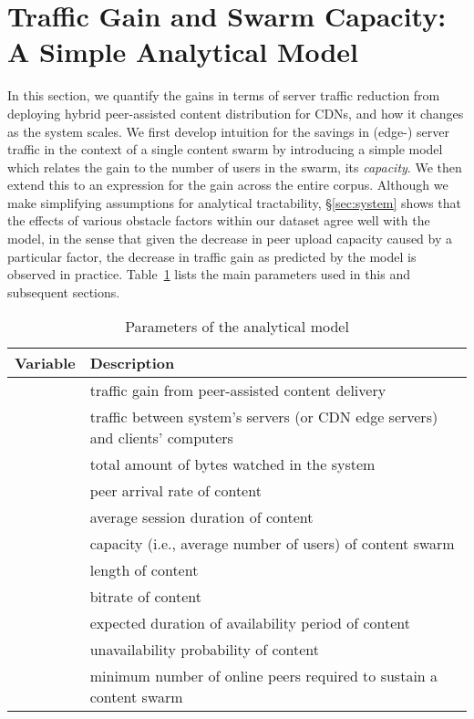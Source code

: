 \documentclass[10pt, conference, letterpaper]{IEEEtran}
\newcommand\tref[1]{Table~\ref{#1}}
\begin{document}
 \section{Traffic Gain and Swarm Capacity: A Simple Analytical Model}
\label{sec:analytical_model}
In this section, we quantify the gains in terms of server traffic reduction from deploying hybrid peer-assisted content distribution for CDNs, and how it changes as the system scales. We first develop intuition for the savings in (edge-) server traffic in the context of a single content swarm by introducing a simple model which relates the gain to the number of users in the swarm, its \emph{capacity}. We then extend this to an expression for the gain across the entire corpus. Although we make simplifying assumptions for analytical tractability, \S\ref{sec:system} shows that the effects of various obstacle factors within our dataset agree well with the model, in the sense that given the decrease in peer upload capacity caused by a particular factor, the decrease in traffic gain as predicted by the model is observed in practice. \tref{tbl:params} lists the main parameters used in this and subsequent sections.
\begin{table}
\small{
\centering
\begin{tabular}{l|p{6cm}}
\toprule
Variable & Description\\
\midrule
 & traffic gain from peer-assisted content delivery\\
 & traffic between system's servers (or CDN edge servers) and clients' computers\\
 & total amount of bytes watched in the system\\
 & peer arrival rate of content \\
 & average session duration of content \\
 & capacity (i.e., average number of users) of content swarm \\
 & length of content \\
 & bitrate of content \\
 & expected duration of availability period of content \\
 & unavailability probability of content \\
 & minimum number of online peers required to sustain a content swarm\\
\bottomrule
\end{tabular}
\caption{Parameters of the analytical model}\vspace{-4mm}
\label{tbl:params}}
\end{table}
\end{document}
